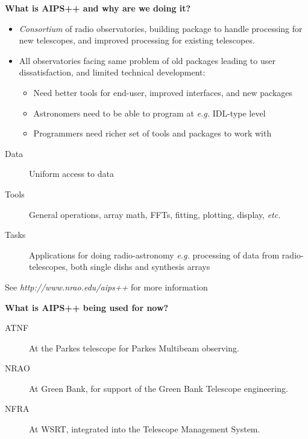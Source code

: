 \documentclass[11pt]{article}
\begin{document}


\newenvironment{slide}[1]{\LARGE\begin{center}{\bf #1}\end{center}}{\newpage}
\newenvironment{figlab}[1]{\Large\begin{center}{\bf #1}\end{center}}{\newpage}

\begin{slide}{What is AIPS++ and why are we doing it?}
\begin{itemize}
\item {\em Consortium} of radio observatories, building package
to handle processing for new telescopes, and improved processing
for existing telescopes.
\item All observatories facing same problem of old packages
leading to user dissatisfaction, and limited technical
development:
\begin{itemize}
\item Need better tools for end-user, improved interfaces,
and new packages
\item Astronomers need to be able to program at {\em e.g.}
IDL-type level
\item Programmers need richer set of tools and packages to
work with
\end{itemize}
\end{itemize}
\begin{description}
\item[Data] Uniform access to data
\item[Tools] General operations, array math, FFTs, fitting, plotting,
display, {\em etc.}
\item[Tasks] Applications for doing radio-astronomy {\em e.g.}
processing of data from radio-telescopes, both single dishs and
synthesis arrays
\end{description}
See {\em http://www.nrao.edu/aips++} for more information
\end{slide}

\begin{slide}{What is AIPS++ being used for now?}
\begin{description}
\item[ATNF] At the Parkes telescope for Parkes Multibeam 
observing.
\item[NRAO] At Green Bank, for support of the Green Bank
Telescope engineering.
\item[NFRA] At WSRT, integrated into the Telescope Management
System.
\end{description}
\end{slide}
\end{document}
